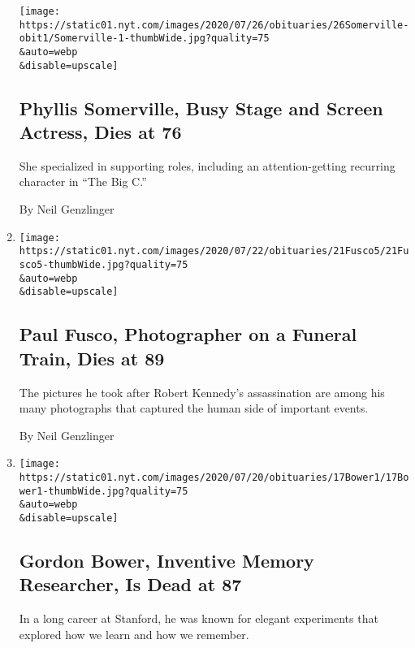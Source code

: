 \begin{enumerate}
  \texttt{[image: https://static01.nyt.com/images/2020/07/26/obituaries/26Somerville-obit1/Somerville-1-thumbWide.jpg?quality=75\\\&auto=webp\\\&disable=upscale]}

  \hypertarget{phyllis-somerville-busy-stage-and-screen-actress-dies-at-76}{%
  \subsection{Phyllis Somerville, Busy Stage and Screen Actress, Dies at
  76}\label{phyllis-somerville-busy-stage-and-screen-actress-dies-at-76}}

  She specialized in supporting roles, including an attention-getting
  recurring character in ``The Big C.''

  By Neil Genzlinger
\item
  \href{/2020/07/21/arts/paul-fusco-photographer-dies.html}{}

  \texttt{[image: https://static01.nyt.com/images/2020/07/22/obituaries/21Fusco5/21Fusco5-thumbWide.jpg?quality=75\\\&auto=webp\\\&disable=upscale]}

  \hypertarget{paul-fusco-photographer-on-a-funeral-train-dies-at-89}{%
  \subsection{Paul Fusco, Photographer on a Funeral Train, Dies at
  89}\label{paul-fusco-photographer-on-a-funeral-train-dies-at-89}}

  The pictures he took after Robert Kennedy's assassination are among
  his many photographs that captured the human side of important events.

  By Neil Genzlinger
\item
  \href{/2020/07/19/science/gordon-bower-dead.html}{}

  \texttt{[image: https://static01.nyt.com/images/2020/07/20/obituaries/17Bower1/17Bower1-thumbWide.jpg?quality=75\\\&auto=webp\\\&disable=upscale]}

  \hypertarget{gordon-bower-inventive-memory-researcher-is-dead-at-87}{%
  \subsection{Gordon Bower, Inventive Memory Researcher, Is Dead at
  87}\label{gordon-bower-inventive-memory-researcher-is-dead-at-87}}

  In a long career at Stanford, he was known for elegant experiments
  that explored how we learn and how we remember.


\end{enumerate}
